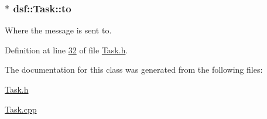 \hypertarget{classdsf_1_1_task_a36c485fbeb9c2330f5637b9d625cf01a}{}
\subsubsection[{to}]{$\ast$ dsf\+::\+Task\+::to}\label{classdsf_1_1_task_a36c485fbeb9c2330f5637b9d625cf01a}
Where the message is sent to. 

Definition at line \hyperlink{_task_8h_source_l00032}{32} of file \hyperlink{_task_8h_source}{Task.\+h}.



The documentation for this class was generated from the following files\+:\begin{DoxyCompactItemize}
\item 
\hyperlink{_task_8h}{Task.\+h}\item 
\hyperlink{_task_8cpp}{Task.\+cpp}\end{DoxyCompactItemize}
